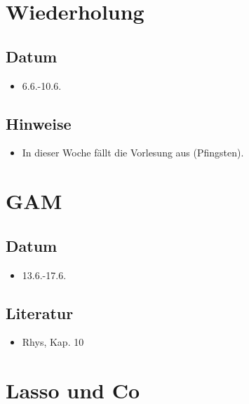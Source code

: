 \documentclass[
]{book}
\providecommand{\tightlist}{%
  \setlength{\itemsep}{0pt}\setlength{\parskip}{0pt}}
\begin{document}
\hypertarget{wiederholung-1}{%
\section{Wiederholung}\label{wiederholung-1}}

\hypertarget{datum-11}{%
\subsection{Datum}\label{datum-11}}

\begin{itemize}
\tightlist
\item
  6.6.-10.6.
\end{itemize}

\hypertarget{hinweise-4}{%
\subsection{Hinweise}\label{hinweise-4}}

\begin{itemize}
\tightlist
\item
  In dieser Woche fällt die Vorlesung aus (Pfingsten).
\end{itemize}

\hypertarget{gam}{%
\section{GAM}\label{gam}}

\hypertarget{datum-12}{%
\subsection{Datum}\label{datum-12}}

\begin{itemize}
\tightlist
\item
  13.6.-17.6.
\end{itemize}

\hypertarget{literatur-11}{%
\subsection{Literatur}\label{literatur-11}}

\begin{itemize}
\tightlist
\item
  Rhys, Kap. 10
\end{itemize}

\hypertarget{lasso-und-co}{%
\section{Lasso und Co}\label{lasso-und-co}}
\end{document}
